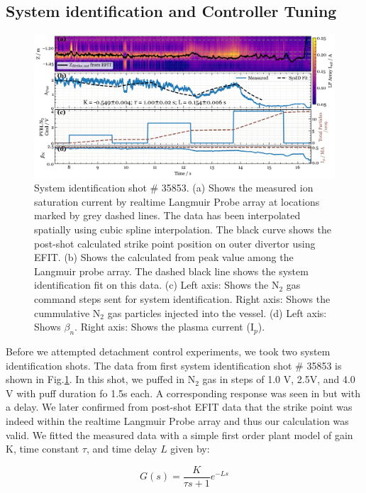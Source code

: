 \subsection{System identification and Controller Tuning}
\label{sec:sysid}

\begin{figure}[!ht]
 \centering
 \includegraphics[width=\textwidth]{figures/DetCtrl_2D_35853.pdf}
 \caption{System identification shot \# 35853. (a) Shows the measured ion saturation current by realtime Langmuir Probe array at locations marked by grey dashed lines. The data has been interpolated spatially using cubic spline interpolation. The black curve shows the post-shot calculated strike point position on outer divertor using EFIT. (b) Shows the \Afrac calculated from peak value among the Langmuir probe array. The dashed black line shows the system identification fit on this data. (c) Left axis: Shows the N$_2$ gas command steps sent for system identification. Right axis: Shows the cummulative N$_2$ gas particles injected into the vessel. (d) Left axis: Shows $\beta_n$. Right axis: Shows the plasma current (I$_p$).}
 \label{fig:sysid_afrac}
\end{figure}

Before we attempted detachment control experiments, we took two system identification shots. The data from first system identification shot \# 35853 is shown in Fig.\ref{fig:sysid_afrac}. In this shot, we puffed in N$_2$ gas in steps of 1.0 V, 2.5V, and 4.0 V with puff duration fo 1.5s each. A corresponding response was seen in \Afrac but with a delay. We later confirmed from post-shot EFIT data that the strike point was indeed within the realtime Langmuir Probe array and thus our \Afrac calculation was valid. We fitted the measured data with a simple first order plant model of gain K, time constant $\tau$, and time delay $L$ given by:

\begin{equation}
    G(s) = \frac{K}{\tau s + 1}e^{-L s}
\label{eq:sysid}
\end{equation}


